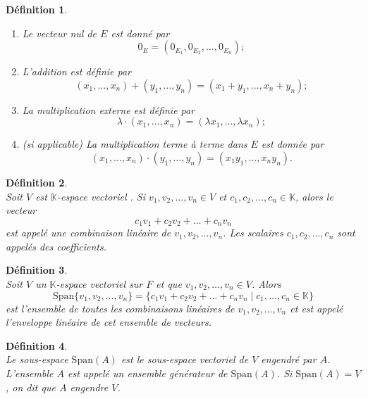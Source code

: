 \documentclass[a4paper, 14pt]{report}
\newtheorem{definition}{Définition}[section]
\begin{document}
\begin{onehalfspace}
{\begin{definition}
	\begin{enumerate}[label=\roman*)]
		\item Le vecteur nul de \( E \) est donné par 
		\[
		0_E = (0_{E_1}, 0_{E_2}, \dots, 0_{E_n});
		\]
		
		\item L’addition est définie par 
		\[
		(x_1, \dots, x_n) + (y_1, \dots, y_n) = (x_1 + y_1, \dots, x_n + y_n);
		\]
		
		\item La multiplication externe est définie par 
		\[
		\lambda \cdot (x_1, \dots, x_n) = (\lambda x_1, \dots, \lambda x_n);
		\]
		
		\item (si applicable) La multiplication terme à terme dans \( E \) est donnée par
		\[
		(x_1, \dots, x_n) \cdot (y_1, \dots, y_n) = (x_1 y_1, \dots, x_n y_n).
		\]
	\end{enumerate}
\end{definition}



\begin{definition} \cite{lang2012algebra}\\
Soit \( V \) est \(\mathbb{K}\)-espace vectoriel . Si \( v_1, v_2, \dots, v_n \in V \) et \( c_1, c_2, \dots, c_n \in \mathbb{K} \), alors le vecteur
	\[
	c_1 v_1 + c_2 v_2 + \dots + c_n v_n
	\]
	est appelé une combinaison linéaire de \( v_1, v_2, \dots, v_n \). Les scalaires \( c_1, c_2, \dots, c_n \) sont appelés des coefficients.
\end{definition}

\begin{definition}\cite{lang2012algebra}\\
Soit \( V \) un \(\mathbb{K}\)-espace vectoriel sur \( F \) et que \( v_1, v_2, \dots, v_n \in V \). Alors
	\[
	\text{Span}\{v_1, v_2, \dots, v_n\} = \{ c_1 v_1 + c_2 v_2 + \dots + c_n v_n \mid c_1, \dots, c_n \in \mathbb{K} \}
	\]
	est l'ensemble de toutes les combinaisons linéaires de \( v_1, v_2, \dots, v_n \) et est appelé l'enveloppe linéaire de cet ensemble de vecteurs.
\end{definition}


\begin{definition} \cite{lang2012algebra} \\
Le sous-espace \( \text{Span}(A) \) est le sous-espace vectoriel de \( V \) engendré par \( A \). L'ensemble \( A \) est appelé un ensemble générateur de \( \text{Span}(A) \). Si \( \text{Span}(A) = V \), on dit que \( A \) engendre \( V \).
\end{definition}


}
\end{onehalfspace}
\end{document}
